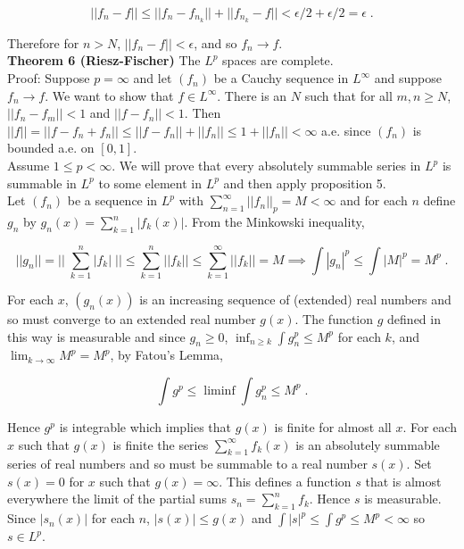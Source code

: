 \documentclass[a4paper]{article}
\begin{document}
$$||f_n - f|| \leq ||f_n - f_{n_k}|| + ||f_{n_k} - f|| < \epsilon / 2 + \epsilon /2 = \epsilon \;.$$

Therefore for $n > N$, $||f_n - f|| < \epsilon$, and so $f_n \rightarrow f$. \\

{\bf Theorem 6 (Riesz-Fischer)} The $L^p$ spaces are complete. \\

Proof: Suppose $p = \infty$ and let $(f_n)$ be a Cauchy sequence in $L^\infty$ and suppose $f_n \rightarrow f$. We want to show that $f \in L^\infty$. There is an $N$ such that for all $m,n \geq N$, $||f_n - f_m|| < 1$ and $||f - f_n|| < 1$. Then $||f|| = ||f - f_n + f_n|| \leq ||f - f_n|| + ||f_n|| \leq 1 + ||f_n|| < \infty$ a.e. since $(f_n)$ is bounded a.e. on $[0,1]$. \\

Assume $1\leq p < \infty$. We will prove that every absolutely summable series in $L^p$ is summable in $L^p$ to some element in $L^p$ and then apply proposition 5. \\

Let $(f_n)$ be a sequence in $L^p$ with $\sum_{n=1}^\infty ||f_n||_p = M < \infty$ and for each $n$ define $g_n$ by $g_n(x) = \sum_{k=1}^n |f_k(x)|$. From the Minkowski inequality, 

$$||g_n|| = || \; \sum_{k=1}^n |f_k| \; || \leq \sum_{k=1}^n ||f_k||  \leq \sum_{k=1}^\infty ||f_k||  = M \implies \int |g_n|^p \leq \int |M|^p = M^p \;.$$

For each $x$, $(g_n(x))$ is an increasing sequence of (extended) real numbers and so must converge to an extended real number $g(x)$. The function $g$ defined in this way is measurable and since $g_n \geq 0$, $\inf_{n\geq k} \int g_n^p \leq M^p$ for each $k$, and $\lim_{k\rightarrow \infty} M^p = M^p$, by Fatou's Lemma,

$$ \int g^p \leq \liminf \int g_n^p \leq M^p \;. $$

Hence $g^p$ is integrable which implies that $g(x)$ is finite for almost all $x$. For each $x$ such that $g(x)$ is finite the series $\sum_{k=1}^\infty f_k(x)$ is an absolutely summable series of real numbers and so must be summable to a real number $s(x)$.  Set $s(x) = 0$ for $x$ such that $g(x) = \infty$. This defines a function $s$ that is almost everywhere the limit of the partial sums $s_n = \sum_{k=1}^n f_k$. Hence $s$ is measurable. Since $|s_n(x)|$ for each $n$, $|s(x)| \leq g(x)$ and $\int |s|^p \leq \int g^p \leq M^p < \infty$ so $s \in L^p$. 
\end{document}
